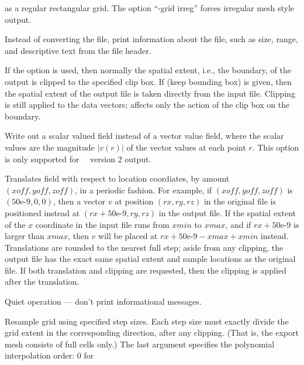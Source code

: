\begin{description}
  as a regular rectangular grid.  The option ``-grid irreg'' forces
  irregular mesh style output.
\item[\optkey{-info}]
  Instead of converting the file, print information about the file, such
  as size, range, and descriptive text from the file header.
\item[\optkey{-keepbb}]
  If the  option is used, then normally the spatial extent,
  i.e., the boundary, of the output is clipped to the specified clip
  box.  If  (keep bounding box) is given, then the spatial
  extent of the output file is taken directly from the input file.
  Clipping is still applied to the data vectors;  affects
  only the action of the clip box on the boundary.
\item[\optkey{-mag}]
  Write out a scalar valued field instead of a vector value field, where
  the scalar values are the magnitude $|v(r)|$ of the vector values at
  each point $r$. This option is only supported for \OOMMF\ \OVF\ version
  2 output.
\item[\optkey{-pertran xoff yoff zoff}]
  Translates field with respect to location coordiates, by amount
  $(\mathit{xoff},\mathit{yoff},\mathit{zoff})$, in a periodic
  fashion.  For example, if
  $(\mathit{xoff},\mathit{yoff},\mathit{zoff})$ is $(\mbox{50e-9},0,0)$,
  then a vector $v$ at position
  $(\mathit{rx},\mathit{ry},\mathit{rz})$
  in the original file is positioned instead at
  $(\mathit{rx} + \mbox{50e-9},\mathit{ry},\mathit{rz})$
  in the output file.  If the spatial extent of the
  $x$ coordinate in the input file runs from $\mathit{xmin}$ to
  $\mathit{xmax}$, and if
  $\mathit{rx} +\mbox{50e-9}$ is larger than $\mathit{xmax}$, then $v$
  will be placed at
  $\mathit{rx} + \mbox{50e-9} - \mathit{xmax} + \mathit{xmin}$
  instead.  Translations are rounded to the
  nearest full step; aside from any clipping, the output file has the
  exact same spatial extent and sample locations as the original file.
  If both translation and clipping are requested, then the clipping is
  applied after the translation.
\item[\optkey{-q}]
  Quiet operation --- don't print informational messages.
\item[\optkey{-resample xstep ystep zstep \boa 0\pipe 1\pipe 3\bca}]
  Resample grid using specified step sizes.  Each step size must exactly
  divide the grid extent in the corresponding direction, after any
  clipping.  (That is, the export mesh consists of full cells only.)
  The last argument specifies the polynomial interpolation order: 0 for

\end{description}
